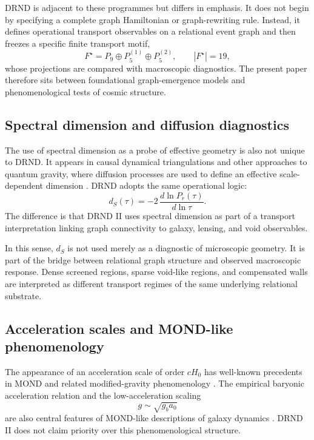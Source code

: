 \documentclass[12pt]{iopart}
\begin{document}
DRND is adjacent to these programmes but differs in emphasis. It does not begin by specifying a complete graph Hamiltonian or graph-rewriting rule. Instead, it defines operational transport observables on a relational event graph and then freezes a specific finite transport motif,
\begin{equation}
F^\star=P_9\oplus P_5^{(1)}\oplus P_5^{(2)},
\qquad |F^\star|=19,
\end{equation}
whose projections are compared with macroscopic diagnostics. The present paper therefore sits between foundational graph-emergence models and phenomenological tests of cosmic structure.

\subsection{Spectral dimension and diffusion diagnostics}

The use of spectral dimension as a probe of effective geometry is also not unique to DRND. It appears in causal dynamical triangulations and other approaches to quantum gravity, where diffusion processes are used to define an effective scale-dependent dimension \cite{Ambjorn2005}. DRND adopts the same operational logic:
\begin{equation}
d_S(\tau)
=
-2\,\frac{d\ln P_r(\tau)}{d\ln \tau}.
\end{equation}
The difference is that DRND II uses spectral dimension as part of a transport interpretation linking graph connectivity to galaxy, lensing, and void observables.

In this sense, \(d_S\) is not used merely as a diagnostic of microscopic geometry. It is part of the bridge between relational graph structure and observed macroscopic response. Dense screened regions, sparse void-like regions, and compensated walls are interpreted as different transport regimes of the same underlying relational substrate.

\subsection{Acceleration scales and MOND-like phenomenology}

The appearance of an acceleration scale of order \(cH_0\) has well-known precedents in MOND and related modified-gravity phenomenology \cite{Milgrom1983,Milgrom2002}. The empirical baryonic acceleration relation and the low-acceleration scaling
\begin{equation}
g\sim\sqrt{g_ba_0}
\end{equation}
are also central features of MOND-like descriptions of galaxy dynamics \cite{McGaugh2016}. DRND II does not claim priority over this phenomenological structure.
\end{document}
